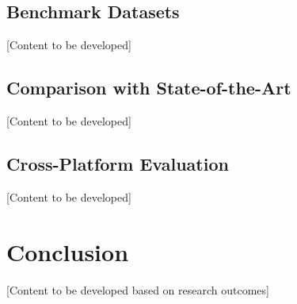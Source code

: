 \subsection{Benchmark Datasets}

[Content to be developed]

\subsection{Comparison with State-of-the-Art}

[Content to be developed]

\subsection{Cross-Platform Evaluation}

[Content to be developed]

\section{Conclusion}

[Content to be developed based on research outcomes]